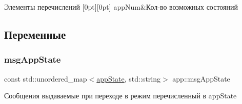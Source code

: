 \begin{DoxyEnumFields}{Элементы перечислений}
[0pt][0pt]{}\mbox{\label{namespaceapp_a290e8080c661e52c2f685fd4af148acfab3c38120e83ed92fbe0aadf4076ad444}} 
app\+Num&Кол-\/во возможных состояний \\
\hline

\end{DoxyEnumFields}


\subsection{Переменные}
\mbox{\label{namespaceapp_a5731c1034c8fb7eaa43470e10aeff84c}} 
\subsubsection{\texorpdfstring{msg\+App\+State}{msgAppState}}
{\footnotesize\ttfamily const std\+::unordered\+\_\+map$<$\hyperlink{namespaceapp_a290e8080c661e52c2f685fd4af148acf}{app\+State}, std\+::string$>$ app\+::msg\+App\+State}

Сообщения выдаваемые при переходе в режим перечисленный в app\+State 